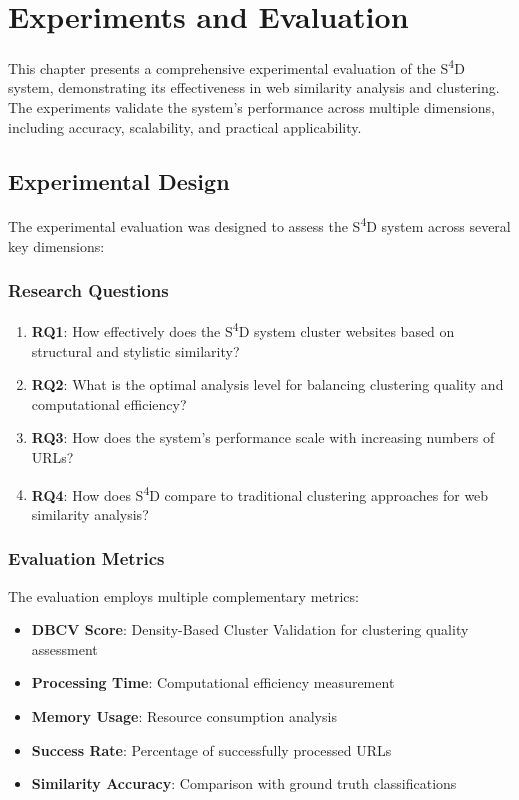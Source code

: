 \chapter{Experiments and Evaluation}
\label{chap:experiments}

This chapter presents a comprehensive experimental evaluation of the S\textsuperscript{4}D system, demonstrating its effectiveness in web similarity analysis and clustering. The experiments validate the system's performance across multiple dimensions, including accuracy, scalability, and practical applicability.

\section{Experimental Design}
\label{sec:experimental-design}

The experimental evaluation was designed to assess the S\textsuperscript{4}D system across several key dimensions:

\subsection{Research Questions}
\label{subsec:research-questions}

\begin{enumerate}
    \item \textbf{RQ1}: How effectively does the S\textsuperscript{4}D system cluster websites based on structural and stylistic similarity?
    \item \textbf{RQ2}: What is the optimal analysis level for balancing clustering quality and computational efficiency?
    \item \textbf{RQ3}: How does the system's performance scale with increasing numbers of URLs?
    \item \textbf{RQ4}: How does S\textsuperscript{4}D compare to traditional clustering approaches for web similarity analysis?
\end{enumerate}

\subsection{Evaluation Metrics}
\label{subsec:evaluation-metrics}

The evaluation employs multiple complementary metrics:

\begin{itemize}
    \item \textbf{DBCV Score}: Density-Based Cluster Validation for clustering quality assessment
    \item \textbf{Processing Time}: Computational efficiency measurement
    \item \textbf{Memory Usage}: Resource consumption analysis
    \item \textbf{Success Rate}: Percentage of successfully processed URLs
\item \textbf{Similarity Accuracy}: Comparison with ground truth classifications
\end{itemize}

